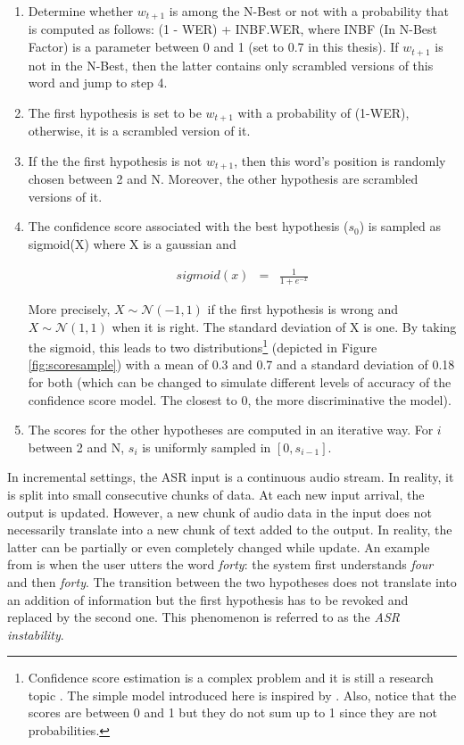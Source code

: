         \begin{enumerate}
        	\item Determine whether $w_{t+1}$ is among the N-Best or not with a probability that is computed as follows: (1 - WER) + INBF.WER, where INBF (In N-Best Factor) is a parameter between 0 and 1 (set to 0.7 in this thesis). If $w_{t+1}$ is not in the N-Best, then the latter contains only scrambled versions of this word and jump to step 4.
            \item The first hypothesis is set to be $w_{t+1}$ with a probability of (1-WER), otherwise, it is a scrambled version of it.
            \item If the the first hypothesis is not $w_{t+1}$, then this word's position is randomly chosen between 2 and N. Moreover, the other hypothesis are scrambled versions of it.
            \item The confidence score associated with the best hypothesis ($s_0$) is sampled as sigmoid(X) where X is a gaussian and
						
						\begin{eqnarray}
							sigmoid(x) & = & \frac{1}{1 + e^{-x}}
						\end{eqnarray}
						
						More precisely, $X \sim \mathcal{N} (-1,1)$ if the first hypothesis is wrong and $X \sim \mathcal{N} (1,1)$ when it is right. The standard deviation of X is one. By taking the sigmoid, this leads to two distributions\footnote{Confidence score estimation is a complex problem and it is still a research topic \cite{Jiang2005,Seigel2011}. The simple model introduced here is inspired by \cite{Pietquin2005}. Also, notice that the scores are between 0 and 1 but they do not sum up to 1 since they are not probabilities.} (depicted in Figure \ref{fig:scoresample}) with a mean of 0.3 and 0.7 and a standard deviation of 0.18 for both (which can be changed to simulate different levels of accuracy of the confidence score model. The closest to 0, the more discriminative the model).
            \item The scores for the other hypotheses are computed in an iterative way. For $i$ between 2 and N, $s_i$ is uniformly sampled in $[0,s_{i-1}]$.
        \end{enumerate}
        
        In incremental settings, the ASR input is a continuous audio stream. In reality, it is split into small consecutive chunks of data. At each new input arrival, the output is updated. However, a new chunk of audio data in the input does not necessarily translate into a new chunk of text added to the output. In reality, the latter can be partially or even completely changed while update. An example from \cite{Schlangen2011} is when the user utters the word \textit{forty}: the system first understands \textit{four} and then \textit{forty}. The transition between the two hypotheses does not translate into an addition of information but the first hypothesis has to be revoked and replaced by the second one. This phenomenon is referred to as the \textit{ASR instability}.
        
